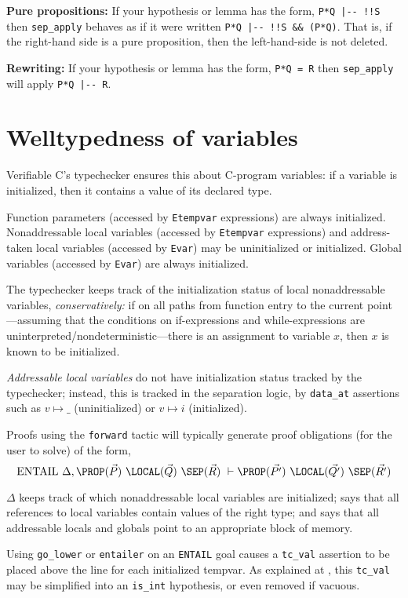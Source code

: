 \documentclass[12pt,fleqn,openany,oneside,showtrims]{memoir}
\newcommand{\ychapter}[2]{\chapter[#1]{#1}}
\begin{document}
\textbf{Pure propositions:} If your hypothesis or lemma has the form,
\lstinline{P*Q |-- !!S} then
\lstinline{sep_apply} behaves as if it were written
\lstinline{P*Q |-- !!S && (P*Q)}.
That is, if the right-hand side is a pure proposition,
then the left-hand-side is not deleted.

\textbf{Rewriting:} If your hypothesis or lemma has the form,
\lstinline{P*Q = R} then \lstinline{sep_apply} will apply
\lstinline{P*Q |-- R}.


\ychapter{Welltypedness of variables}{}
\label{refcard:tcval2}

Verifiable C's typechecker ensures this about
C-program variables: if a variable is initialized, then it contains
a value of its declared type.

Function parameters (accessed by
\lstinline{Etempvar} expressions)
are always initialized.
Nonaddressable local variables (accessed by
\lstinline{Etempvar} expressions) and address-taken local variables
(accessed by \lstinline{Evar})
may be uninitialized or initialized.
Global variables (accessed by \lstinline{Evar}) are always
initialized.

The typechecker keeps track of the
initialization status of local nonaddressable
variables, \emph{conservatively:}
if on all paths from function entry to the current
point---assuming that the conditions on if-expressions
and while-expressions are uninterpreted/nondeterministic---there
is an assignment to variable $x$, then $x$ is known to
be initialized.

\emph{Addressable local variables} do not
have initialization status tracked by the typechecker;
instead, this is tracked in the separation logic,
by \lstinline{data_at} assertions such as $v \mapsto \_$
(uninitialized)
or $v \mapsto i$ (initialized).

Proofs using the \lstinline{forward} tactic will typically
generate proof obligations (for the user to solve)
of the form,
\[
\mathrm{ENTAIL}~\Delta,
\PROP(\vec{P})~
\LOCAL(\vec{Q})~
\SEP(\vec{R})
~\vdash
\PROP(\vec{P'})~
\LOCAL(\vec{Q'})~
\SEP(\vec{R'})
\]

$\Delta$
keeps track of which nonaddressable local variables are initialized;
says that all references to local variables
contain values of the right type;
and says that all addressable locals and globals point
to an appropriate block of memory.

Using \lstinline{go_lower} or \lstinline{entailer} on
an \lstinline{ENTAIL} goal causes a
\lstinline{tc_val} assertion to be placed above the line
for each initialized tempvar.
As explained at ,
this \lstinline{tc_val} may be simplified into
an \lstinline{is_int} hypothesis, or even removed if vacuous.
\end{document}
